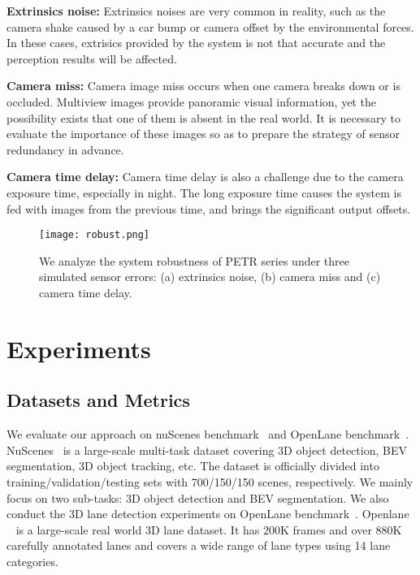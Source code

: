 \documentclass[10pt,twocolumn,letterpaper]{article}
\begin{document}
\noindent \textbf{Extrinsics noise:} Extrinsics noises are very common in reality, such as the camera shake caused by a car bump or camera offset by the environmental forces. In these cases, extrisics provided by the system is not that accurate and the perception results will be affected.

\noindent \textbf{Camera miss:} Camera image miss occurs when one camera breaks down or is occluded. Multiview images provide panoramic visual information, yet the possibility exists that one of them is absent in the real world. It is necessary to evaluate the importance of these images so as to prepare the strategy of sensor redundancy in advance.

\noindent \textbf{Camera time delay:} Camera time delay is also a challenge due to the camera exposure time, especially in night. The long exposure time causes the system is fed with images from the previous time, and brings the significant output offsets.

\begin{figure}[h]
	\centering  
\texttt{[image: robust.png]}
	\caption{We analyze the system robustness of PETR series under three simulated sensor errors: (a) extrinsics noise, (b) camera miss and (c) camera time delay.}  
	\label{fig:robust}
\end{figure}









\section{Experiments}

\subsection{Datasets and Metrics}
We evaluate our approach on nuScenes benchmark~\cite{caesar2020nuscenes} and OpenLane benchmark~\cite{chen2022persformer}. NuScenes~\cite{caesar2020nuscenes} is a large-scale multi-task dataset covering 3D object detection, BEV segmentation, 3D object tracking, etc. 
The dataset is officially divided into training/validation/testing sets with 700/150/150 scenes, respectively.
We mainly focus on two sub-tasks: 3D object detection and BEV segmentation. 
We also conduct the 3D lane detection experiments on OpenLane benchmark~\cite{chen2022persformer}. Openlane ~\cite{chen2022persformer} is a large-scale real world 3D lane dataset. It has 200K frames and over 880K carefully annotated lanes and covers a wide range of lane types using 14 lane categories.
\end{document}
